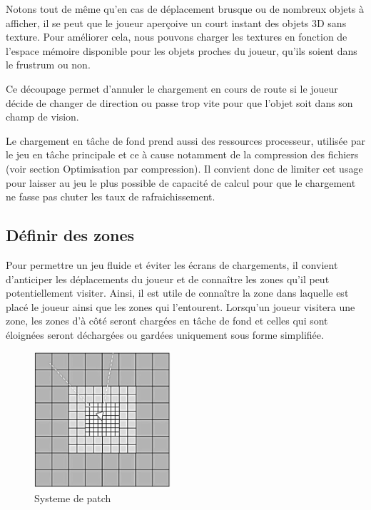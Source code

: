 \documentclass[a4paper, 11pt]{article} %
\begin{document}
Notons tout de même qu'en cas de déplacement brusque ou de nombreux objets à afficher, il se peut que le joueur aperçoive un court instant des objets 3D sans texture. Pour améliorer cela, nous pouvons charger les textures en fonction de l'espace mémoire disponible pour les objets proches du joueur, qu'ils soient dans le frustrum ou non.

Ce découpage permet d'annuler le chargement en cours de route si le joueur décide de changer de direction ou passe trop vite pour que l'objet soit dans son champ de vision.

Le chargement en tâche de fond prend aussi des ressources processeur, utilisée par le jeu en tâche principale et ce à cause notamment de la compression des fichiers (voir section Optimisation par compression). Il convient donc de limiter cet usage pour laisser au jeu le plus possible de capacité de calcul pour que le chargement ne fasse pas chuter les taux de rafraichissement.

\newpage
\subsection*{Définir des zones}
Pour permettre un jeu fluide et éviter les écrans de chargements, il convient d'anticiper les déplacements du joueur et de connaître les zones qu'il peut potentiellement visiter. Ainsi, il est utile de connaître la zone dans laquelle est placé le joueur ainsi que les zones qui l'entourent. Lorsqu'un joueur visitera une zone, les zones d'à côté seront chargées en tâche de fond et celles qui sont éloignées seront déchargées ou gardées uniquement sous forme simplifiée.

\begin{figure}
\begin{center}
\includegraphics[width=0.45\textwidth]{images/patch-system-three.png}
\end{center}
\caption{Systeme de patch}
\end{figure}
\end{document}
